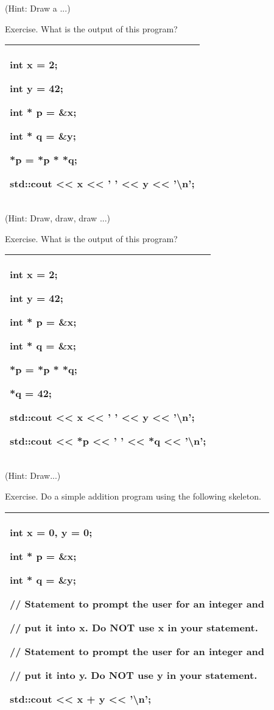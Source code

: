 \documentclass[
]{article}
\begin{document}
(Hint: Draw a ...)

Exercise. What is the output of this program?

\begin{longtable}[]{@{}l@{}}
\toprule
\endhead
\begin{minipage}[t]{0.97\columnwidth}\raggedright
int x = 2;

int y = 42;

int * p = \&x;

int * q = \&y;

*p = *p * *q;

std::cout \textless\textless{} x \textless\textless{} ' '
\textless\textless{} y \textless\textless{} '\textbackslash n';\strut
\end{minipage}\tabularnewline
\bottomrule
\end{longtable}

(Hint: Draw, draw, draw ...)

Exercise. What is the output of this program?

\begin{longtable}[]{@{}l@{}}
\toprule
\endhead
\begin{minipage}[t]{0.97\columnwidth}\raggedright
int x = 2;

int y = 42;

int * p = \&x;

int * q = \&x;

*p = *p * *q;

*q = 42;

std::cout \textless\textless{} x \textless\textless{} ' '
\textless\textless{} y \textless\textless{} '\textbackslash n';

std::cout \textless\textless{} *p \textless\textless{} ' '
\textless\textless{} *q \textless\textless{} '\textbackslash n';\strut
\end{minipage}\tabularnewline
\bottomrule
\end{longtable}

(Hint: Draw...)

Exercise. Do a simple addition program using the following skeleton.

\begin{longtable}[]{@{}l@{}}
\toprule
\endhead
\begin{minipage}[t]{0.97\columnwidth}\raggedright
int x = 0, y = 0;

int * p = \&x;

int * q = \&y;

// Statement to prompt the user for an integer and

// put it into x. Do NOT use x in your statement.

// Statement to prompt the user for an integer and

// put it into y. Do NOT use y in your statement.

std::cout \textless\textless{} x + y \textless\textless{}
'\textbackslash n';\strut
\end{minipage}\tabularnewline
\bottomrule
\end{longtable}
\end{document}

